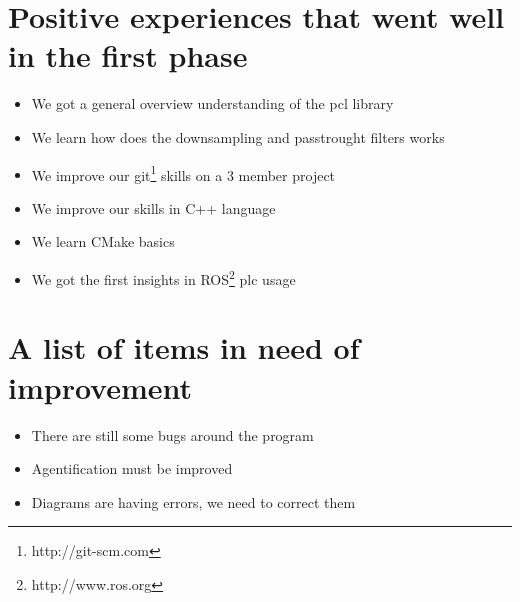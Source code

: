 \documentclass[paper=a4, fontsize=12pt]{scrartcl} %
\numberwithin{equation}{section} %
\numberwithin{figure}{section} %
\numberwithin{table}{section} %
\begin{document}


\section{Positive experiences that went well in the first phase}

\begin{itemize}
  \item We got  a general overview understanding of the pcl library
  \item We learn how does the downsampling and passtrought filters works
  \item We improve our git\footnote{http://git-scm.com} skills on a 3 member project
  \item We improve our skills in C++ language
  \item We learn CMake basics
  \item We got the first insights in ROS\footnote{http://www.ros.org} plc usage
\end{itemize}



\section{A list of items in need of improvement}

\begin{itemize}
  \item There are still some bugs around the program
  \item Agentification must be improved
  \item Diagrams are having errors, we need to correct them
\end{itemize}


\end{document}
